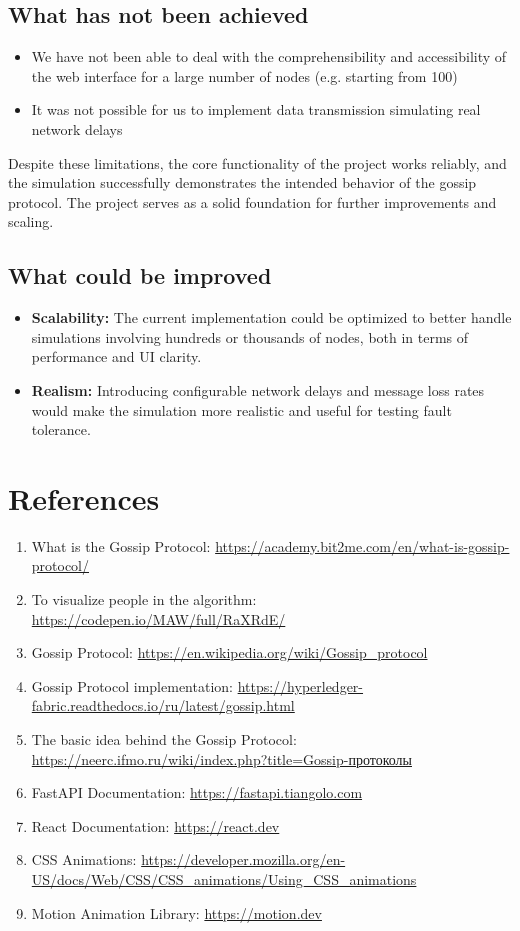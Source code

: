 \documentclass[a4paper,12pt]{article}
\begin{document}
\subsection{What has not been achieved}
\begin{itemize}
    \item We have not been able to deal with the comprehensibility and accessibility of the web interface for a large number of nodes (e.g. starting from 100)
    \item It was not possible for us to implement data transmission simulating real network delays
\end{itemize}
Despite these limitations, the core functionality of the project works reliably, and the simulation successfully demonstrates the intended behavior of the gossip protocol. The project serves as a solid foundation for further improvements and scaling.

\subsection{What could be improved}
\begin{itemize}
    \item \textbf{Scalability:} The current implementation could be optimized to better handle simulations involving hundreds or thousands of nodes, both in terms of performance and UI clarity.
    \item \textbf{Realism:} Introducing configurable network delays and message loss rates would make the simulation more realistic and useful for testing fault tolerance.
\end{itemize}

\section{References}

\begin{enumerate}
    \item What is the Gossip Protocol: \url{https://academy.bit2me.com/en/what-is-gossip-protocol/}
    \item To visualize people in the algorithm: \url{https://codepen.io/MAW/full/RaXRdE/}
    \item Gossip Protocol: \url{https://en.wikipedia.org/wiki/Gossip_protocol}
    \item Gossip Protocol implementation: \url{https://hyperledger-fabric.readthedocs.io/ru/latest/gossip.html}
    \item The basic idea behind the Gossip Protocol: \url{https://neerc.ifmo.ru/wiki/index.php?title=Gossip-протоколы}
    \item FastAPI Documentation: \url{https://fastapi.tiangolo.com}
    \item React Documentation: \url{https://react.dev}
    \item CSS Animations: \url{https://developer.mozilla.org/en-US/docs/Web/CSS/CSS_animations/Using_CSS_animations}
    \item Motion Animation Library: \url{https://motion.dev}
\end{enumerate}
\end{document}
